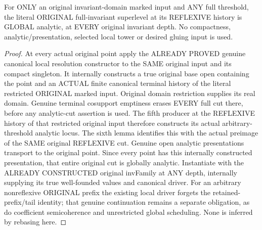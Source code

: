 \begin{theorem}
\label{hir:original-reflexive-arbitrary-full-threshold-global-analytic}
\leanok
For ONLY an original invariant-domain marked input and ANY full threshold,
the literal ORIGINAL full-invariant superlevel at its REFLEXIVE history is
GLOBAL analytic, at EVERY original invariant depth. No compactness,
analytic/presentation, selected local tower or desired gluing input is used.
\end{theorem}
\begin{proof}
At every actual original point apply the ALREADY PROVED genuine canonical
local resolution constructor to the SAME original input and its compact
singleton. It internally constructs a true original base open containing
the point and an ACTUAL finite canonical terminal history of the literal
restricted ORIGINAL marked input. Original domain restriction supplies its
real domain. Genuine terminal cosupport emptiness erases EVERY full cut
there, before any analytic-cut assertion is used. The fifth producer at
the REFLEXIVE history of that restricted original input therefore constructs
its actual arbitrary-threshold analytic locus. The sixth lemma identifies
this with the actual preimage of the SAME original REFLEXIVE cut. Genuine
open analytic presentations transport to the original point. Since every
point has this internally constructed presentation, that entire original
cut is globally analytic. Instantiate with the ALREADY CONSTRUCTED original
invFamily at ANY depth, internally supplying its true well-founded values
and canonical driver. For an arbitrary nonreflexive ORIGINAL prefix the
existing local driver forgets the retained-prefix/tail identity; that genuine
continuation remains a separate obligation, as do coefficient semicoherence
and unrestricted global scheduling. None is inferred by rebasing here.
\end{proof}
